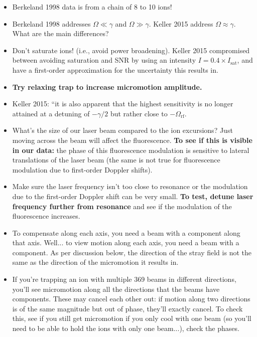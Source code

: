 \documentclass{article}
\begin{document}
\begin{itemize}
\item Berkeland 1998 data is from a chain of 8 to 10 ions! 

\item Berkeland 1998  addresses $\Omega \ll \gamma$ and $\Omega \gg \gamma$. Keller 2015 address $\Omega \approx \gamma$. What are the main differences?

\item Don't saturate ions! (i.e., avoid power broadening). Keller 2015 compromised between avoiding saturation and SNR by using an intensity $I = 0.4 \times I_{\mathrm{sat}}$, and have a first-order approximation for the uncertainty this results in.

\item \textbf{Try relaxing trap to increase micromotion amplitude.}

\item Keller 2015: ``it is also apparent that the highest sensitivity is no longer attained at a detuning of $-\gamma/2$ but rather close to $-\Omega_{\mathrm{rf}}$. 

\item What's the size of our laser beam compared to the ion excursions? Just moving across the beam will affect the fluorescence. \textbf{To see if this is visible in our data:} the phase of this fluorescence modulation is sensitive to lateral translations of the laser beam (the same is not true for fluorescence modulation due to first-order Doppler shifts).

\item Make sure the laser frequency isn't too close to resonance or the modulation due to the first-order Doppler shift can be very small.\textbf{ To test, detune laser frequency further from resonance} and see if the modulation of the fluorescence increases.

\item To compensate along each axis, you need a beam with a component along that axis. Well... to view motion along each axis, you need a beam with a component. As per discussion below, the direction of the stray field is not the same as the direction of the micromotion it results in.

\item If you're trapping an ion with multiple 369 beams in different directions, you'll see micromotion along all the directions that the beams have components. These may cancel each other out: if motion along two directions is of the same magnitude but out of phase, they'll exactly cancel. To check this, see if you still get micromotion if you only cool with one beam (so you'll need to be able to hold the ions with only one beam...), check the phases.


\end{itemize}
\end{document}
